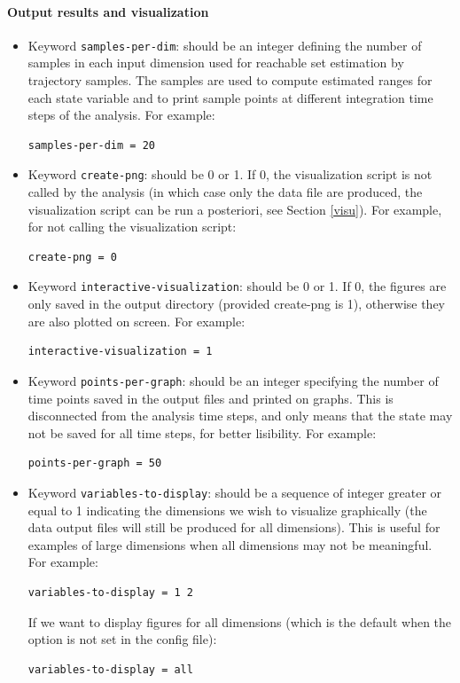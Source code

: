 \documentclass{article}
\begin{document}
\paragraph{Output results and visualization}
\begin{itemize}
\item Keyword \texttt{samples-per-dim}: should be an integer defining the number of samples in each input dimension used  for reachable set estimation by trajectory samples.  The samples are used  to compute estimated ranges for each state variable and to print sample points at different integration time steps of the analysis.
For example:
\begin{verbatim}
samples-per-dim = 20
\end{verbatim}

\item Keyword \texttt{create-png}: should be 0 or 1. If 0, the visualization script is not called by the analysis (in which case only the data file are produced,  the visualization script can be run a posteriori, see Section \ref{visu}).
For example, for not calling the visualization script:
\begin{verbatim}
create-png = 0
\end{verbatim}

\item Keyword \texttt{interactive-visualization}: should be 0 or 1.  If 0,  the figures are only saved in the output directory (provided create-png is 1), otherwise they are also plotted on screen. 
For example:
\begin{verbatim}
interactive-visualization = 1
\end{verbatim}

\item Keyword \texttt{points-per-graph}: should be an integer specifying the number of time points saved in the output files and printed on graphs. This is disconnected from the analysis time steps, and only means that the state may not be saved for all time steps, for better lisibility. 
For example:
\begin{verbatim}
points-per-graph = 50
\end{verbatim}

\item Keyword \texttt{variables-to-display}: should be a sequence of integer greater or equal to 1 indicating the dimensions we wish to visualize graphically (the data output files will still be produced for all dimensions). This is useful for examples of large dimensions when all dimensions may not be meaningful. 
For example:
\begin{verbatim}
variables-to-display = 1 2
\end{verbatim}
If we want to display figures for all dimensions (which is the default when the option is not set in the config file):
\begin{verbatim}
variables-to-display = all
\end{verbatim}
\end{itemize}
\end{document}
